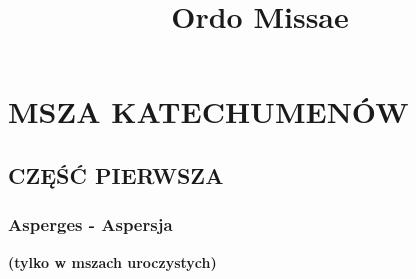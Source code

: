 \documentclass[10pt,titlepage]{article}
\title{Ordo Missae}
\author{}
\begin{document}
	\maketitle
	\clearpage
	\tableofcontents
	\clearpage
	
	\section{MSZA KATECHUMENÓW}
	
	\subsection{CZĘŚĆ PIERWSZA}
	
	\subsubsection{Asperges - Aspersja}
	\textbf{(tylko w mszach uroczystych)}
	
\end{document}
